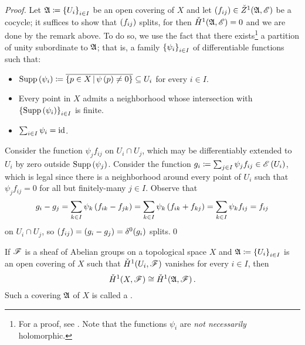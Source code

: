 \documentclass[../Moduli_Spaces_of_Riemann_Surfaces.tex]{subfiles}
\begin{document}
    \begin{proof}
        Let $\mathfrak{A}\coloneqq\left\{U_i\right\}_{i\in I}$ be an open covering of $X$ and let $\left(f_{ij}\right)\in\check{Z}^1\!\left(\mathfrak{A},\mathscr{E}\right)$ be a cocycle; it suffices to show that $\left(f_{ij}\right)$ splits, for then $\check{H}^1\!\left(\mathfrak{A},\mathscr{E}\right)=0$ and we are done by the remark above. To do so, we use the fact that there exists\footnote{For a proof, see \cite[][Theorem 2.23]{lee}. Note that the functions $\psi_i$ are \textit{not necessarily} holomorphic.} a partition of unity subordinate to $\mathfrak{A}$; that is, a family $\left\{\psi_i\right\}_{i\in I}$ of differentiable functions such that:
        \begin{itemize}
            \item $\operatorname{Supp}\left(\psi_i\right)\coloneqq\overline{\left\{p\in X\,\middle\vert\,\psi\left(p\right)\neq0\right\}}\subseteq U_i$ for every $i\in I$.
                \vspace{-0.05in}
            \item Every point in $X$ admits a neighborhood whose intersection with $\left\{\operatorname{Supp}\left(\psi_i\right)\right\}_{i\in I}$ is finite.
                \vspace{-0.05in}
            \item $\sum_{i\in I}\psi_i=\operatorname{id}$.
        \end{itemize}
        Consider the function $\psi_jf_{ij}$ on $U_i\cap U_j$, which may be differentiably extended to $U_i$ by zero outside $\operatorname{Supp}\left(\psi_j\right)$. Consider the function $g_i\coloneqq\sum_{j\in I}\psi_jf_{ij}\in\mathscr{E}\left(U_i\right)$, which is legal since there is a neighborhood around every point of $U_i$ such that $\psi_jf_{ij}=0$ for all but finitely-many $j\in I$. Observe that
        \begin{equation*}
            g_i-g_j=\sum_{k\in I}\psi_k\left(f_{ik}-f_{jk}\right)=\sum_{k\in I}\psi_k\left(f_{ik}+f_{kj}\right)=\sum_{k\in I}\psi_kf_{ij}=f_{ij}
        \end{equation*}
        on $U_i\cap U_j$, so $\left(f_{ij}\right)=\left(g_i-g_j\right)=\delta^0\!\left(g_i\right)$ splits.\qed
    \end{proof}
    \begin{proposition}[Leray]\label{CC:prp:leray}
        If $\mathscr{F}$ is a sheaf of Abelian groups on a topological space $X$ and $\mathfrak{A}\coloneqq\left\{U_i\right\}_{i\in I}$ is an open covering of $X$ such that $\check{H}^1\!\left(U_i,\mathscr{F}\right)$ vanishes for every $i\in I$, then
        \begin{equation*}
            \check{H}^1\!\left(X,\mathscr{F}\right)\cong\check{H}^1\!\left(\mathfrak{A},\mathscr{F}\right).
        \end{equation*}
        Such a covering $\mathfrak{A}$ of $X$ is called a .
    \end{proposition}
\end{document}
